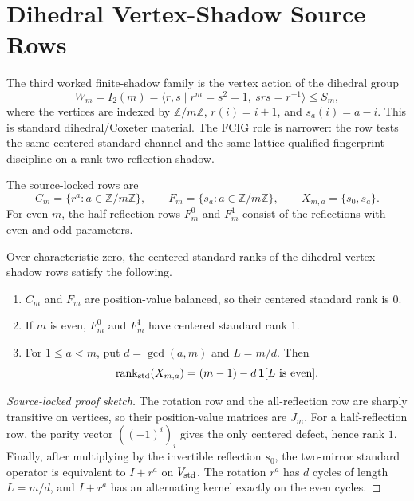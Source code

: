 \section{Dihedral Vertex-Shadow Source Rows}

The third worked finite-shadow family is the vertex action of the dihedral group
\[
  W_m=I_2(m)=\langle r,s\mid r^m=s^2=1,\ srs=r^{-1}\rangle \leq S_m,
\]
where the vertices are indexed by \(\mathbb Z/m\mathbb Z\), \(r(i)=i+1\), and \(s_a(i)=a-i\).  This is standard dihedral/Coxeter material\cite{BjornerBrenti2005}.  The FCIG role is narrower: the row tests the same centered standard channel and the same lattice-qualified fingerprint discipline on a rank-two reflection shadow.

The source-locked rows are
\[
  C_m=\{r^a:a\in\mathbb Z/m\mathbb Z\},\qquad
  F_m=\{s_a:a\in\mathbb Z/m\mathbb Z\},\qquad
  X_{m,a}=\{s_0,s_a\}.
\]
For even \(m\), the half-reflection rows \(F_m^0\) and \(F_m^1\) consist of the reflections with even and odd parameters.

\begin{proposition}\label{prop:dihedral-standard-rows}
Over characteristic zero, the centered standard ranks of the dihedral vertex-shadow rows satisfy the following.
\begin{enumerate}[label=\textup{(\alph*)},leftmargin=*]
  \item \(C_m\) and \(F_m\) are position-value balanced, so their centered standard rank is \(0\).
  \item If \(m\) is even, \(F_m^0\) and \(F_m^1\) have centered standard rank \(1\).
  \item For \(1\leq a<m\), put \(d=\gcd(a,m)\) and \(L=m/d\).  Then
  \[
    \operatorname{rank}_{\mathrm{std}}(X_{m,a})=(m-1)-d\,\mathbf 1[L\text{ is even}].
  \]
\end{enumerate}
\end{proposition}

\begin{proof}[Source-locked proof sketch]
The rotation row and the all-reflection row are sharply transitive on vertices, so their position-value matrices are \(J_m\).  For a half-reflection row, the parity vector \(((-1)^i)_i\) gives the only centered defect, hence rank \(1\).  Finally, after multiplying by the invertible reflection \(s_0\), the two-mirror standard operator is equivalent to \(I+r^a\) on \(V_{\mathrm{std}}\).  The rotation \(r^a\) has \(d\) cycles of length \(L=m/d\), and \(I+r^a\) has an alternating kernel exactly on the even cycles.
\end{proof}

